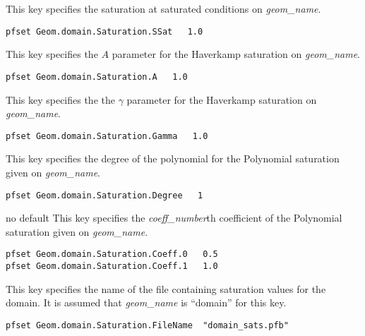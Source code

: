 {This key specifies the saturation at saturated conditions on {\em geom\_name}.
}
\begin{display}\begin{verbatim}
pfset Geom.domain.Saturation.SSat   1.0
\end{verbatim}\end{display}

{This key specifies the $A$ parameter for the Haverkamp saturation
on {\em geom\_name}.
}
\begin{display}\begin{verbatim}
pfset Geom.domain.Saturation.A   1.0
\end{verbatim}\end{display}

{This key specifies the the $\gamma$ parameter for the Haverkamp saturation 
on {\em geom\_name}.
}
\begin{display}\begin{verbatim}
pfset Geom.domain.Saturation.Gamma   1.0
\end{verbatim}\end{display}

{This key specifies the degree of the polynomial for the Polynomial 
saturation given on {\em geom\_name}.
}
\begin{display}\begin{verbatim}
pfset Geom.domain.Saturation.Degree   1
\end{verbatim}\end{display}

{no default}
{This key specifies the {\em coeff\_number}th coefficient of the Polynomial
saturation given on {\em geom\_name}.
}
\begin{display}\begin{verbatim}
pfset Geom.domain.Saturation.Coeff.0   0.5
pfset Geom.domain.Saturation.Coeff.1   1.0
\end{verbatim}\end{display}

{This key specifies the name of the file containing saturation values for the
domain.  It is assumed that {\em geom\_name} is ``domain'' for this key.}
\begin{display}\begin{verbatim}
pfset Geom.domain.Saturation.FileName  "domain_sats.pfb"
\end{verbatim}\end{display}

